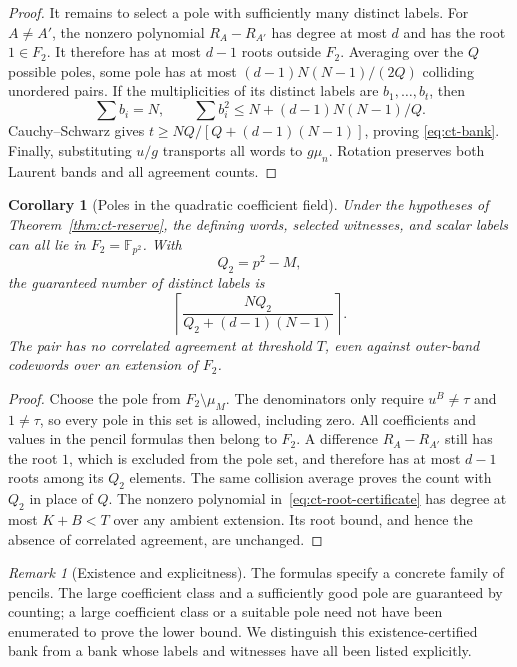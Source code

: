 \documentclass[11pt,letterpaper]{article}
\newtheorem{corollary}[theorem]{Corollary}
\theoremstyle{definition}
\theoremstyle{remark}
\newtheorem{remark}[theorem]{Remark}
\begin{document}
\begin{proof}
It remains to select a pole with sufficiently many distinct labels. For
$A\ne A'$, the nonzero polynomial $R_A-R_{A'}$ has degree at most $d$
and has the root $1\in F_2$. It therefore has at most $d-1$ roots outside
$F_2$. Averaging over the $Q$ possible poles, some pole has at most
$(d-1)N(N-1)/(2Q)$ colliding unordered pairs. If the multiplicities of its
distinct labels are $b_1,\ldots,b_t$, then
\[
 \sum b_i=N,\qquad
 \sum b_i^2\le N+(d-1)N(N-1)/Q.
\]
Cauchy--Schwarz gives $t\ge NQ/[Q+(d-1)(N-1)]$, proving
\eqref{eq:ct-bank}. Finally, substituting $u/g$ transports all words to
$g\mu_n$. Rotation preserves both Laurent bands and all agreement counts.
\end{proof}

\begin{corollary}[Poles in the quadratic coefficient field]
\label{cor:ct-subfield-poles}
Under the hypotheses of Theorem~\ref{thm:ct-reserve}, the defining
words, selected witnesses, and scalar labels can all lie in
$F_2=\mathbb F_{p^2}$. With
\[
 Q_2=p^2-M,
\]
the guaranteed number of distinct labels is
\[
 \left\lceil\frac{NQ_2}{Q_2+(d-1)(N-1)}\right\rceil.
\]
The pair has no correlated agreement at threshold $T$, even against
outer-band codewords over an extension of $F_2$.
\end{corollary}
\begin{proof}
Choose the pole from $F_2\setminus\mu_M$. The denominators only
require $u^B\ne\tau$ and $1\ne\tau$, so every pole in this set is
allowed, including zero. All coefficients and values in the pencil
formulas then belong to $F_2$. A difference $R_A-R_{A'}$ still has
the root $1$, which is excluded from the pole set, and therefore has
at most $d-1$ roots among its $Q_2$ elements. The same collision
average proves the count with $Q_2$ in place of $Q$.
The nonzero polynomial in~\eqref{eq:ct-root-certificate} has degree
at most $K+B<T$ over any ambient extension. Its root bound, and hence
the absence of correlated agreement, are unchanged.
\end{proof}

\begin{remark}[Existence and explicitness]
The formulas specify a concrete family of pencils. The large coefficient
class and a sufficiently good pole are guaranteed by counting; a
large coefficient class or a suitable pole need not have been enumerated to prove the
lower bound. We distinguish this existence-certified bank from a bank
whose labels and witnesses have all been listed explicitly.
\end{remark}
\end{document}
